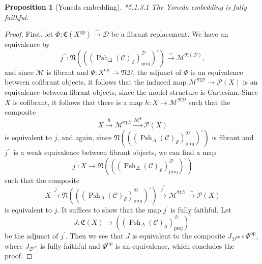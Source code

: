 \documentclass[leqno]{article}
\numberwithin{equation}{subsection}
\theoremstyle{plain}   %
\newtheorem{prop}[equation]{Proposition}
\theoremstyle{remark}
\theoremstyle{plain}
\newcommand{\op}{\ensuremath{\mathrm{op}}}
\newcommand{\M}{\ensuremath{\mathcal{M}}}
\newcommand{\Pre}{\ensuremath{\mathcal{P}}}
\newcommand{\setS}{\ensuremath{\mathscr{S}}}
\newcommand{\spsh}{\ensuremath{\operatorname{Psh}_\Delta(\mathcal{C})}}
\begin{document}
\begin{prop}[Yoneda embedding]\cite{htt}*{5.1.3.1}
	The Yoneda embedding is fully faithful.
\end{prop}
\begin{proof} 
	First, let \(\Phi:\mathfrak{C}(X^\op)\xrightarrow{\sim} \mathcal{D}\) be a fibrant replacement.  We have an equivalence by  
	\[j^{\prime\prime}: \mathfrak{N}\left(\left((\spsh_\setS)^\mathcal{D}_\mathrm{proj}\right)^\circ\right) \xrightarrow{\sim} \M^{\mathfrak{N}(\mathcal{D})}, \]
	and since \(\M\) is fibrant and \(\Psi:X^\op \to \mathfrak{N}\mathcal{D}\), the adjunct of \(\Phi\) is an equivalence between cofibrant objects, it follows that the induced map \(\M^{\mathfrak{N}\mathcal{D}}\to \Pre(X)\) is an equivalence between fibrant objects, since the model structure is Cartesian.  Since \(X\) is cofibrant, it follows that there is a map \(h:X\to \M^{\mathfrak{N}\mathcal{D}}\) such that the composite
	\[X \xrightarrow{h} \M^{\mathfrak{N}\mathcal{D}} \xrightarrow{\M^{\Psi}} \Pre(X)\]
	is equivalent to \(j\), and again, since \(\mathfrak{N}\left(\left((\spsh_\setS)^\mathcal{D}_\mathrm{proj}\right)^\circ\right)\) is fibrant and \(j^{\prime\prime}\) is a weak equivalence between fibrant objects, we can find a map 
	\[j^\prime:X\to \mathfrak{N}\left(\left((\spsh_\setS)^\mathcal{D}_\mathrm{proj}\right)^\circ\right)\]
	such that the composite 
	\[X\xrightarrow{j^\prime} \mathfrak{N}\left(\left((\spsh_\setS)^\mathcal{D}_\mathrm{proj}\right)^\circ\right) \xrightarrow{j^{\prime\prime}} \M^{\mathfrak{N}\mathcal{D}} \xrightarrow{\sim} \Pre(X)\]
	is equivalent to \(j\).
	It suffices to show that the map \(j^\prime\) is fully faithful.  Let 
	\[J:\mathfrak{C}(X) \to \left((\spsh_\setS)^\mathcal{D}_\mathrm{proj}\right)^\circ\]
	be the adjunct of \(j^\prime\).  Then we see that \(J\) is equivalent to the composite \(J_{\mathcal{D^\op}}\circ \Phi^\op\), where \(J_{\mathcal{D^\op}}\) is fully-faithful and \(\Phi^\op\) is an equivalence, which concludes the proof.	
\end{proof}
\end{document}
